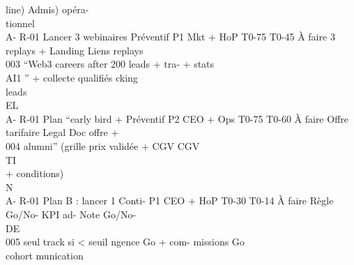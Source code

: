 line)                                                                Admis) opéra-\\
tionnel\\
A- R-01    Lancer 3 webinaires Préventif P1   Mkt + HoP    T0-75 T0-45 À faire   3 replays +   Landing Liens replays\\
003        “Web3 careers after                                                   200 leads     + tra-  + stats\\
AI1 ” + collecte                                                      qualifiés     cking\\
leads\\
\vspace{0.5em}
\vspace{0.5em}
\vspace{0.5em}
\vspace{0.5em}
EL\\
A- R-01    Plan “early bird + Préventif P2    CEO + Ops    T0-75 T0-60 À faire   Offre tarifaire Legal     Doc offre +\\
004        alumni” (grille prix                                                  validée + CGV             CGV\\
\vspace{0.5em}
\vspace{0.5em}
\vspace{0.5em}
\vspace{0.5em}
TI\\
+ conditions)\\
\vspace{0.5em}
\vspace{0.5em}
\vspace{0.5em}
\vspace{0.5em}
N\\
A- R-01    Plan B : lancer 1     Conti-  P1   CEO + HoP    T0-30 T0-14 À faire   Règle Go/No- KPI ad- Note Go/No-\\
\vspace{0.5em}
\vspace{0.5em}
\vspace{0.5em}
\vspace{0.5em}
DE\\
005        seul track si \textless{} seuil ngence                                          Go + com-      missions Go\\
cohort                                                                munication\\
\vspace{0.5em}
\vspace{0.5em}
